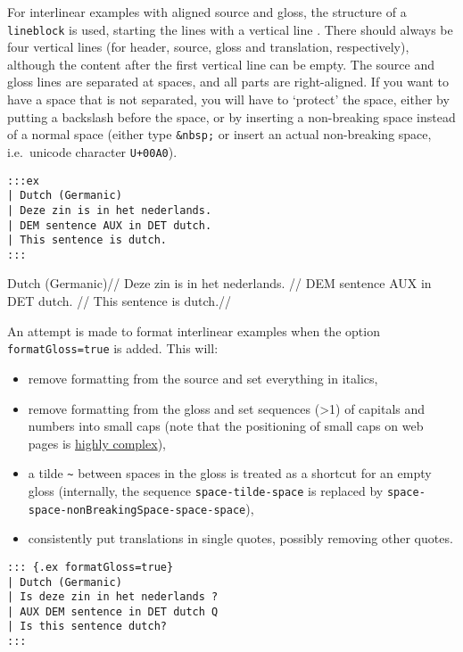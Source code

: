 \documentclass[
]{article}
\providecommand{\tightlist}{%
  \setlength{\itemsep}{0pt}\setlength{\parskip}{0pt}}
\begin{document}
For interlinear examples with aligned source and gloss, the structure of
a \texttt{lineblock} is used, starting the lines with a vertical line
\texttt{\textbar{}}. There should always be four vertical lines (for
header, source, gloss and translation, respectively), although the
content after the first vertical line can be empty. The source and gloss
lines are separated at spaces, and all parts are right-aligned. If you
want to have a space that is not separated, you will have to `protect'
the space, either by putting a backslash before the space, or by
inserting a non-breaking space instead of a normal space (either type
\texttt{\&nbsp;} or insert an actual non-breaking space, i.e.~unicode
character \texttt{U+00A0}).

\begin{verbatim}
:::ex
| Dutch (Germanic)
| Deze zin is in het nederlands.
| DEM sentence AUX in DET dutch.
| This sentence is dutch.
:::
\end{verbatim}

\begin{samepage}
  \begingl
  \glpreamble Dutch (Germanic)//
  \gla Deze zin is in het nederlands. //
  \glb DEM sentence AUX in DET dutch. //
  \glft This sentence is dutch.//
  \endgl
\xe
\end{samepage}

An attempt is made to format interlinear examples when the option
\texttt{formatGloss=true} is added. This will:

\begin{itemize}
\tightlist
\item
  remove formatting from the source and set everything in italics,
\item
  remove formatting from the gloss and set sequences (\textgreater1) of
  capitals and numbers into small caps (note that the positioning of
  small caps on web pages is
  \href{https://iamvdo.me/en/blog/css-font-metrics-line-height-and-vertical-align}{highly
  complex}),
\item
  a tilde \texttt{\textasciitilde{}} between spaces in the gloss is
  treated as a shortcut for an empty gloss (internally, the sequence
  \texttt{space-tilde-space} is replaced by
  \texttt{space-space-nonBreakingSpace-space-space}),
\item
  consistently put translations in single quotes, possibly removing
  other quotes.
\end{itemize}

\begin{verbatim}
::: {.ex formatGloss=true}
| Dutch (Germanic)
| Is deze zin in het nederlands ?
| AUX DEM sentence in DET dutch Q
| Is this sentence dutch?
:::
\end{verbatim}
\end{document}

